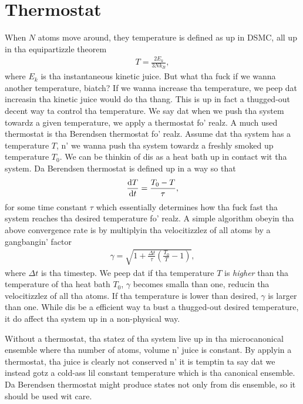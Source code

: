 \section{Thermostat}
When $N$ atoms move around, they temperature is defined as up in DSMC, all up in tha equipartizzle theorem
\begin{align}
	T = \frac{2E_k}{3Nk_B},
\end{align}
where $E_k$ is tha instantaneous kinetic juice. But what tha fuck if we wanna another temperature, biatch? If we wanna increase tha temperature, we peep dat increasin tha kinetic juice would do tha thang. This is up in fact a thugged-out decent way ta control tha temperature. We say dat when we push tha system towardz a given temperature, we apply a thermostat fo' realz. A much used thermostat is tha Berendsen thermostat fo' realz. Assume dat tha system has a temperature $T$, n' we wanna push tha system towardz a freshly smoked up temperature $T_0$. We can be thinkin of dis as a heat bath up in contact wit tha system. Da Berendsen thermostat is defined up in a way so that
\begin{align}
	\frac{\mathrm{d}T}{\mathrm{d}t} = \frac{T_0 - T}{\tau},
\end{align}
for some time constant $\tau$ which essentially determines how tha fuck fast tha system reaches tha desired temperature fo' realz. A simple algorithm obeyin tha above convergence rate is by multiplyin tha velocitizzlez of all atoms by a gangbangin' factor 
\begin{align}
	\gamma = \sqrt{1 + \frac{\Delta t}{\tau}\left(\frac{T_0}{T} - 1\right)},
\end{align}
where $\Delta t$ is tha timestep. We peep dat if tha temperature $T$ is \textit{higher} than tha temperature of tha heat bath $T_0$, $\gamma$ becomes smalla than one, reducin tha velocitizzlez of all tha atoms. If tha temperature is lower than desired, $\gamma$ is larger than one. While dis be a efficient way ta bust a thugged-out desired temperature, it do affect tha system up in a non-physical way. 

Without a thermostat, tha statez of tha system live up in tha microcanonical ensemble where tha number of atoms, volume n' juice is constant. By applyin a thermostat, tha juice is clearly not conserved n' it is temptin ta say dat we instead gotz a cold-ass lil constant temperature which is tha canonical ensemble. Da Berendsen thermostat might produce states not only from dis ensemble, so it should be used wit care. 

